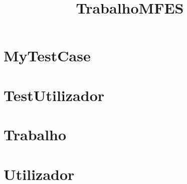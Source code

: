 \documentclass{article}
\begin{document}
\title{TrabalhoMFES}
\author{}
\maketitle
\tableofcontents

\section{MyTestCase}

\section{TestUtilizador}

\section{Trabalho}

\section{Utilizador}

\end{document}
